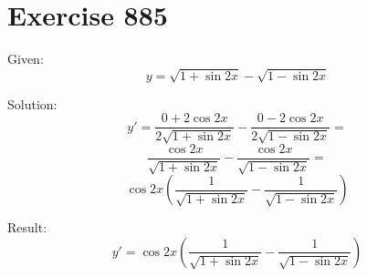 \documentclass[a4paper, 10pt]{scrartcl}
\begin{document}
\section{Exercise 885}

Given:
\[
y = \sqrt{1 + \sin{2x}} - \sqrt{1 - \sin{2x}}
\]

Solution:
\[
y' = \frac{0 + 2\cos{2x}}{2\sqrt{1 + \sin{2x}}} - \frac{0 - 2\cos{2x}}{2\sqrt{1 - \sin{2x}}} =
\]
\[
\frac{\cos{2x}}{\sqrt{1 + \sin{2x}}} - \frac{\cos{2x}}{\sqrt{1 - \sin{2x}}} =
\]
\[
\cos{2x}\left(\frac{1}{\sqrt{1 + \sin{2x}}} - \frac{1}{\sqrt{1 - \sin{2x}}}\right)
\]

Result:
\[
y' = \cos{2x}\left(\frac{1}{\sqrt{1 + \sin{2x}}} - \frac{1}{\sqrt{1 - \sin{2x}}}\right)
\]
\end{document}
